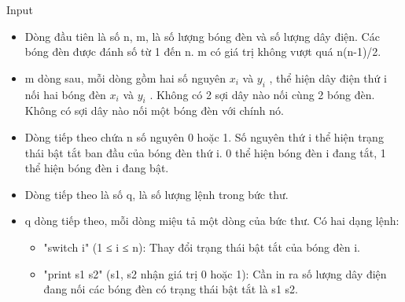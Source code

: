 Input
\begin{itemize}
	\item Dòng đầu tiên là số n, m, là số lượng bóng đèn và số lượng dây điện. Các bóng đèn được đánh số từ 1 đến n. m có giá trị không vượt quá n(n-1)/2.
	\item m dòng sau, mỗi dòng gồm hai số nguyên $x_{i}$ và $y_{i}$ , thể hiện dây điện thứ i nối hai bóng đèn $x_{i}$ và $y_{i}$ . Không có 2 sợi dây nào nối cùng 2 bóng đèn. Không có sợi dây nào nối một bóng đèn với chính nó.
	\item Dòng tiếp theo chứa n số nguyên 0 hoặc 1. Số nguyên thứ i thể hiện trạng thái bật tắt ban đầu của bóng đèn thứ i. 0 thể hiện bóng đèn i đang tắt, 1 thể hiện bóng đèn i đang bật.
	\item Dòng tiếp theo là số q, là số lượng lệnh trong bức thư.
	\item q dòng tiếp theo, mỗi dòng miệu tả một dòng của bức thư. Có hai dạng lệnh:
\begin{itemize}
	\item "switch i" (1 ≤ i ≤ n): Thay đổi trạng thái bật tắt của bóng đèn i.
	\item "print s1 s2" (s1, s2 nhận giá trị 0 hoặc 1): Cần in ra số lượng dây điện đang nối các bóng đèn có trạng thái bật tắt là s1 s2.
\end{itemize}
\end{itemize}